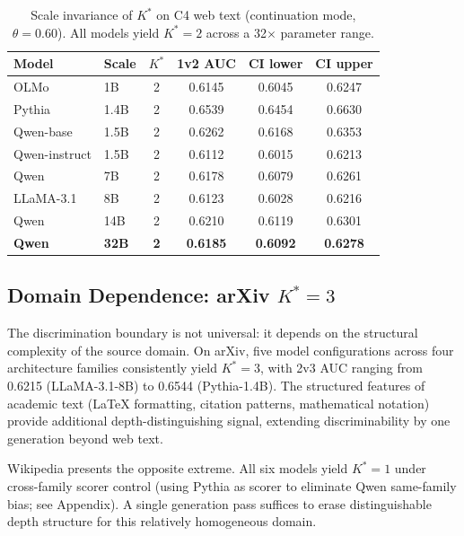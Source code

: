 \documentclass[11pt,a4paper]{article}
\begin{document}
\begin{table}[t]
\centering
\small
\caption{Scale invariance of $K^*$ on C4 web text (continuation mode, $\theta\!=\!0.60$). All models yield $K^*\!=\!2$ across a 32$\times$ parameter range.}
\label{tab:scale}
\begin{tabular}{llcccc}
\toprule
\textbf{Model} & \textbf{Scale} & \textbf{$K^*$} & \textbf{1v2 AUC} & \textbf{CI lower} & \textbf{CI upper} \\
\midrule
OLMo            & 1B   & 2 & 0.6145 & 0.6045 & 0.6247 \\
Pythia          & 1.4B & 2 & 0.6539 & 0.6454 & 0.6630 \\
Qwen-base       & 1.5B & 2 & 0.6262 & 0.6168 & 0.6353 \\
Qwen-instruct   & 1.5B & 2 & 0.6112 & 0.6015 & 0.6213 \\
Qwen            & 7B   & 2 & 0.6178 & 0.6079 & 0.6261 \\
LLaMA-3.1       & 8B   & 2 & 0.6123 & 0.6028 & 0.6216 \\
Qwen            & 14B  & 2 & 0.6210 & 0.6119 & 0.6301 \\
\textbf{Qwen}   & \textbf{32B} & \textbf{2} & \textbf{0.6185} & \textbf{0.6092} & \textbf{0.6278} \\
\bottomrule
\end{tabular}
\end{table}

\subsection{Domain Dependence: arXiv $K^*\!=\!3$}
\label{sec:domain}

The discrimination boundary is not universal: it depends on the structural complexity of the source domain. On arXiv, five model configurations across four architecture families consistently yield $K^*\!=\!3$, with 2v3 AUC ranging from 0.6215 (LLaMA-3.1-8B) to 0.6544 (Pythia-1.4B). The structured features of academic text (LaTeX formatting, citation patterns, mathematical notation) provide additional depth-distinguishing signal, extending discriminability by one generation beyond web text.

Wikipedia presents the opposite extreme. All six models yield $K^*\!=\!1$ under cross-family scorer control (using Pythia as scorer to eliminate Qwen same-family bias; see Appendix). A single generation pass suffices to erase distinguishable depth structure for this relatively homogeneous domain.
\end{document}
